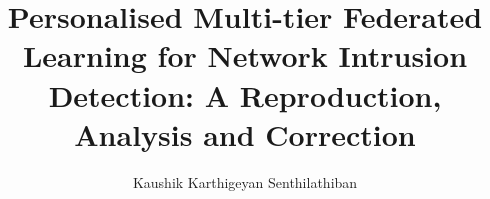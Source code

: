 \documentclass[12pt,MSc]{mmuthesis}
\begin{document}
\copyrightfalse
\title{Personalised Multi-tier Federated Learning for Network Intrusion
Detection: A Reproduction, Analysis and Correction}
\author{Kaushik Karthigeyan Senthilathiban}
\def\degreetitle{\missing{Master of Science in Cyber Security}}
\beforeabstract
{}

\afterabstract
\body








\printbibliography
\end{document}
